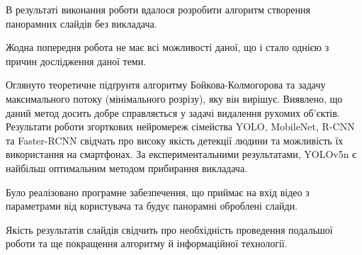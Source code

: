 В результаті виконання роботи вдалося
розробити алгоритм створення панорамних слайдів без викладача.


Жодна попередня робота не має всі можливості даної, що і стало однією
з причин дослідження даної теми.


Оглянуто теоретичне підґрунтя алгоритму Бойкова-Колмогорова та задачу
максимального потоку (мінімального розрізу), яку він вирішує. Виявлено, що
даний метод досить добре справляється у задачі видалення рухомих об'єктів.
Результати роботи згорткових нейромереж сімейства YOLO, MobileNet, R-CNN та
Faster-RCNN свідчать про високу якість детекції людини та можливість
їх використання на смартфонах. За експериментальними результатами, YOLOv5n є найбільш оптимальним
методом прибирання викладача.


Було реалізовано програмне забезпечення,
що приймає на вхід відео з параметрами від користувача та
будує панорамні оброблені слайди.


Якість результатів слайдів свідчить про необхідність проведення подальшої роботи та
ще покращення алгоритму й інформаційної технології.
\clearpage